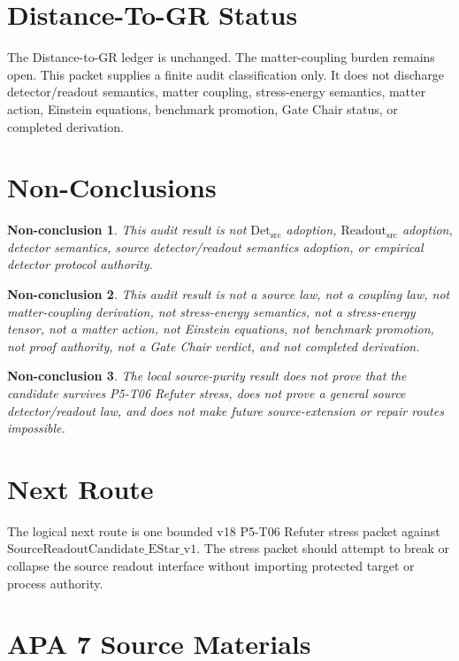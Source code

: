 \documentclass[11pt]{article}
\newcommand{\ReadoutSrc}{\mathrm{Readout}_{\mathrm{src}}}
\newcommand{\DetSrc}{\mathrm{Det}_{\mathrm{src}}}
\newtheorem{nonconclusion}{Non-conclusion}
\begin{document}
\section{Distance-To-GR Status}

The Distance-to-GR ledger is unchanged. The matter-coupling burden remains
open. This packet supplies a finite audit classification only. It does not
discharge detector/readout semantics, matter coupling, stress-energy
semantics, matter action, Einstein equations, benchmark promotion, Gate Chair
status, or completed derivation.

\section{Non-Conclusions}

\begin{nonconclusion}
This audit result is not \(\DetSrc\) adoption, \(\ReadoutSrc\) adoption,
detector semantics, source detector/readout semantics adoption, or empirical
detector protocol authority.
\end{nonconclusion}

\begin{nonconclusion}
This audit result is not a source law, not a coupling law, not
matter-coupling derivation, not stress-energy semantics, not a stress-energy
tensor, not a matter action, not Einstein equations, not benchmark promotion,
not proof authority, not a Gate Chair verdict, and not completed derivation.
\end{nonconclusion}

\begin{nonconclusion}
The local source-purity result does not prove that the candidate survives
P5-T06 Refuter stress, does not prove a general source detector/readout law,
and does not make future source-extension or repair routes impossible.
\end{nonconclusion}

\section{Next Route}

The logical next route is one bounded v18 P5-T06 Refuter stress packet against
\(\mathrm{SourceReadoutCandidate\_EStar\_v1}\). The stress packet should
attempt to break or collapse the source readout interface without importing
protected target or process authority.

\section{APA 7 Source Materials}
\end{document}

